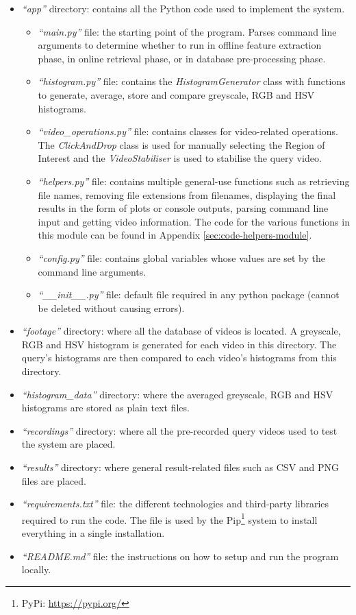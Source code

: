 \begin{itemize}
    \item \textit{``app''} directory: contains all the Python code used to implement the system.
    \begin{itemize}
        \item \textit{``main.py''} file: the starting point of the program. Parses command line arguments to determine whether to run in offline feature extraction phase, in online retrieval phase, or in database pre-processing phase.
        \item \textit{``histogram.py''} file: contains the \textit{HistogramGenerator} class with functions to generate, average, store and compare greyscale, RGB and HSV histograms.
        \item \textit{``video\_operations.py''} file: contains classes for video-related operations. The \textit{ClickAndDrop} class is used for manually selecting the Region of Interest and the \textit{VideoStabiliser} is used to stabilise the query video.
        \item \textit{``helpers.py''} file: contains multiple general-use functions such as retrieving file names, removing file extensions from filenames, displaying the final results in the form of plots or console outputs, parsing command line input and getting video information. The code for the various functions in this module can be found in Appendix \ref{sec:code-helpers-module}.
        \item \textit{``config.py''} file: contains global variables whose values are set by the command line arguments.
        \item \textit{``\_\_init\_\_.py''} file: default file required in any python package (cannot be deleted without causing errors).
    \end{itemize}
    \item \textit{``footage''} directory: where all the database of videos is located. A greyscale, RGB and HSV histogram is generated for each video in this directory. The query's histograms are then compared to each video's histograms from this directory.
    \item \textit{``histogram\_data''} directory: where the averaged greyscale, RGB and HSV histograms are stored as plain text files.
    \item \textit{``recordings''} directory: where all the pre-recorded query videos used to test the system are placed.
    \item \textit{``results''} directory: where general result-related files such as CSV and PNG files are placed.
    \item \textit{``requirements.txt''} file: the different technologies and third-party libraries required to run the code. The file is used by the Pip\footnote{PyPi: \url{https://pypi.org/}} system to install everything in a single installation.
    \item \textit{``README.md''} file: the instructions on how to setup and run the program locally.
\end{itemize}

